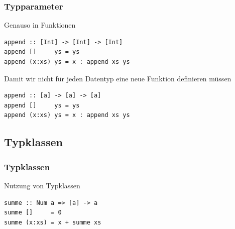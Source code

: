 \documentclass[fleqn,11pt,aspectratio=43]{beamer}
\begin{document}
\begin{frame}[fragile]
\frametitle{Typparameter}
\begin{block}{Genauso in Funktionen}
\begin{lstlisting}
append :: [Int] -> [Int] -> [Int]
append []     ys = ys
append (x:xs) ys = x : append xs ys
\end{lstlisting}
\end{block}
\pause
\begin{block}{Damit wir nicht für jeden Datentyp eine neue Funktion definieren müssen}
\begin{lstlisting}
append :: [a] -> [a] -> [a]
append []     ys = ys
append (x:xs) ys = x : append xs ys
\end{lstlisting}
\end{block}
\end{frame}
\subsection{Typklassen}


\begin{frame}[fragile]
\frametitle{Typklassen}
\begin{block}{Nutzung von Typklassen}
\begin{lstlisting}
summe :: Num a => [a] -> a
summe []     = 0
summe (x:xs) = x + summe xs
\end{lstlisting}
\end{block}
\end{frame}
\end{document}

